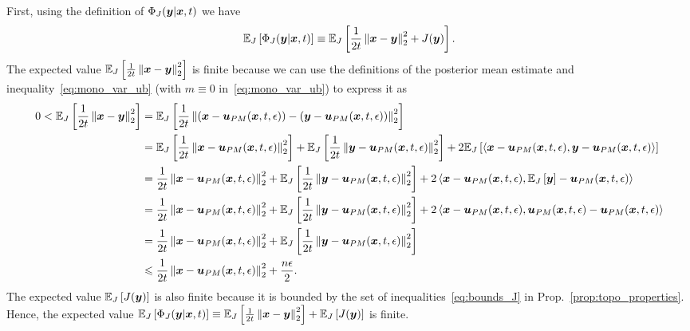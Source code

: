 First, using the definition of $\Phi_{J}(\by|\bx,t)$ we have
\[
\expectationJ{\Phi_{J}(\by|\bx,t)} \equiv \expectationJ{\frac{1}{2t}\normsq{\bx-\by} + J(\by)}. \\
\]
The expected value $\expectationJ{\frac{1}{2t}\normsq{\bx-\by}}$ is finite because we can use the definitions of the posterior mean estimate and inequality~\eqref{eq:mono_var_ub} (with $m \equiv 0$ in~\eqref{eq:mono_var_ub}) to express it as
\begin{equation*}
\begin{alignedat}{1}
0 < \expectationJ{\frac{1}{2t}\normsq{\bx-\by}} &= \expectationJ{\frac{1}{2t}\normsq{(\bx-\bu_{PM}(\bx,t,\epsilon)) - (\by - \bu_{PM}(\bx,t,\epsilon))}} \\
&= \expectationJ{\frac{1}{2t}\normsq{\bx-\bu_{PM}(\bx,t,\epsilon)}} + \expectationJ{\frac{1}{2t}\normsq{\by-\bu_{PM}(\bx,t,\epsilon)}} + 2\expectationJ{\left\langle \bx -\bu_{PM}(\bx,t,\epsilon),\by - \bu_{PM}(\bx,t,\epsilon) \right\rangle} \\
&= \frac{1}{2t}\normsq{\bx-\bu_{PM}(\bx,t,\epsilon)} + \expectationJ{\frac{1}{2t}\normsq{\by-\bu_{PM}(\bx,t,\epsilon)}} + 2\left\langle \bx -\bu_{PM}(\bx,t,\epsilon),\expectationJ{\by} - \bu_{PM}(\bx,t,\epsilon) \right\rangle \\
&= \frac{1}{2t}\normsq{\bx-\bu_{PM}(\bx,t,\epsilon)} + \expectationJ{\frac{1}{2t}\normsq{\by-\bu_{PM}(\bx,t,\epsilon)}} + 2\left\langle \bx -\bu_{PM}(\bx,t,\epsilon),\bu_{PM}(\bx,t,\epsilon) - \bu_{PM}(\bx,t,\epsilon) \right\rangle\\
&= \frac{1}{2t}\normsq{\bx-\bu_{PM}(\bx,t,\epsilon)} + \expectationJ{\frac{1}{2t}\normsq{\by-\bu_{PM}(\bx,t,\epsilon)}}\\
&\leqslant \frac{1}{2t}\normsq{\bx-\bu_{PM}(\bx,t,\epsilon)} + \frac{n\epsilon}{2}.
\end{alignedat}
\end{equation*}
The expected value $\expectationJ{J(\by)}$ is also finite because it is bounded by the set of inequalities~\eqref{eq:bounds_J} in Prop.~\ref{prop:topo_properties}. Hence, the expected value $\expectationJ{\Phi_{J}(\by|\bx,t)} \equiv \expectationJ{\frac{1}{2t}\normsq{\bx-\by}} + \expectationJ{J(\by)}$ is finite.

